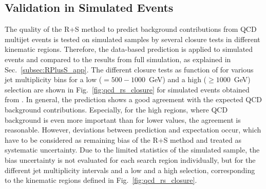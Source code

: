 \subsection{Validation in Simulated Events}
\label{subsec:validation_mc}
The quality of the R+S method to predict background contributions from QCD multijet events is tested on simulated samples by several closure tests in different kinematic regions. Therefore, the data-based prediction is applied to simulated events and compared to the results from full simulation, as explained in Sec.~\ref{subsec:RPlusS_app}. The different closure tests as function of \MHT for various jet multiplicity bins for a low \HT ($= 500 - 1000$~GeV) and a high \HT ($\ge 1000$~GeV) selection are shown in Fig.~\ref{fig:qcd_rs_closure} for simulated events obtained from \madgraph. In general, the prediction shows a good agreement with the expected QCD background contributions. Especially, for the high \HT regions, where QCD background is even more important than for lower \HT values, the agreement is reasonable. However, deviations between prediction and expectation occur, which have to be considered as remaining bias of the R+S method and treated as systematic uncertainty. Due to the limited statistics of the simulated sample, the bias uncertainty is not evaluated for each search region individually, but for the different jet multiplicity intervals and a low and a high \HT selection, corresponding to the kinematic regions defined in Fig.~\ref{fig:qcd_rs_closure}.
